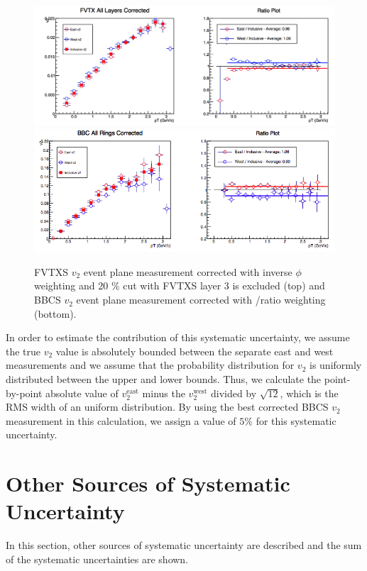 \begin{figure}[!h]
\begin{center}
\includegraphics[width=0.75\linewidth]{figs/fvtx_corrected.png}
\includegraphics[width=0.75\linewidth]{figs/bbc_pp_correction.png}
\caption{ FVTXS $v_2$ event plane measurement corrected with inverse $\phi$ weighting and 20 $\%$ cut with FVTXS layer 3 is excluded (top) and BBCS $v_2$ event plane measurement corrected with \pp/\pau ratio weighting (bottom).}
\label{fig:fvtx_corrected_best}
\end{center}
\end{figure}

In order to estimate the contribution of this systematic uncertainty, we assume the true $v_2$ value is absolutely bounded between the separate east and west measurements and we assume that the probability distribution for $v_2$ is uniformly distributed between the upper and lower bounds. Thus, we calculate the point-by-point absolute value of $v_2^{\textrm{east}}$ minus the $v_2^{\textrm{west}}$ divided by $\sqrt{12}$, which is the RMS width of an uniform distribution. By using the best corrected BBCS $v_2$ measurement in this calculation, we assign a value of $5\%$ for this systematic uncertainty.


\section{Other Sources of Systematic Uncertainty}
In this section, other sources of systematic uncertainty are described and the sum of the systematic uncertainties are shown.
